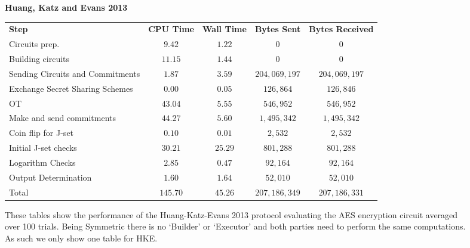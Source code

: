 \documentclass[ %
                    author={Nicholas Tutte},
                supervisor={Prof. Nigel Smart},
                    degree={MEng},
                     title={Secure Two Party Computation},
                  subtitle={A practical comparison of recent protocols},
                      type={Research - GG1K},
                      year={2015} ]{dissertation}
\begin{document}
				\begin{figure}[!ht]
					\begin{center}
						\textbf{Huang, Katz and Evans 2013}\\
						\begin{tabular}{| p{3.5cm} | c c c c |}
							\hline
							\textbf{Step} & \textbf{CPU Time} & \textbf{Wall Time} & \textbf{Bytes Sent} & \textbf{Bytes Received} \\
							\thickhline
							Circuits prep. & $9.42$ & $1.22$ & $0$ & $0$ \\
							\hline
							Building circuits & $11.15$ & $1.44$ & $0$ & $0$ \\
							\hline
							Sending Circuits and Commitments & $1.87$ & $3.59$ & $204,069,197$ & $204,069,197$ \\
							\hline
							Exchange Secret Sharing Schemes & $0.00$ & $0.05$ & $126,864$ & $126,846$ \\
							\hline
							OT & $43.04$ & $5.55$ & $546,952$ & $546,952$ \\
							\hline
							Make and send commitments & $44.27$ & $5.60$ & $1,495,342$ & $1,495,342$ \\
							\hline
							Coin flip for J-set & $0.10$ & $0.01$ & $2,532$ & $2,532$ \\
							\hline
							Initial J-set checks & $30.21$ & $25.29$ & $801,288$ & $801,288$ \\
							\hline
							Logarithm Checks & $2.85$ & $0.47$ & $92,164$ & $92,164$ \\
							\hline
							Output Determination & $1.60$ & $1.64$ & $52,010$ & $52,010$ \\
							\thickhline
							Total & $145.70$ & $45.26$ & $207,186,349$ & $207,186,331$ \\
							\hline
						\end{tabular}
					\end{center}
					\caption{These tables show the performance of the Huang-Katz-Evans 2013 protocol evaluating the AES encryption circuit averaged over 100 trials. Being Symmetric there is no `Builder' or `Executor' and both parties need to perform the same computations. As such we only show one table for HKE.\label{table:HKE_2013_AES}}
				\end{figure}


% 
% 
\end{document}
